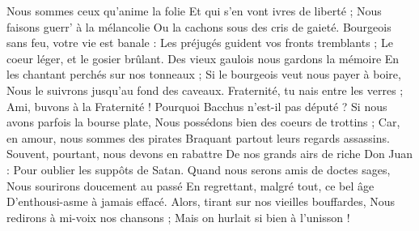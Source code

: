  \footnotemark
[ititle={Marche des Etudiants, La}, ititle={Chant des étudiants}, tu={Les Gueux (P. : Paul Vanderborght, 1919)}]

\beginverse
Nous sommes ceux qu'anime la folie
Et qui s'en vont ivres de liberté ;
Nous faisons guerr' à la mélancolie
Ou la cachons sous des cris de gaieté.
Bourgeois sans feu, votre vie est banale :
Les préjugés guident vos fronts tremblants ;
Le coeur léger, et le gosier brûlant. 
\endverse
\beginverse
Des vieux gaulois nous gardons la mémoire
En les chantant perchés sur nos tonneaux ;
Si le bourgeois veut nous payer à boire,
Nous le suivrons jusqu'au fond des caveaux.
Fraternité, tu nais entre les verres ;
Ami, buvons à la Fraternité !
Pourquoi Bacchus n'est-il pas député ? 
\endverse
\beginverse
Si nous avons parfois la bourse plate,
Nous possédons bien des coeurs de trottins ;
Car, en amour, nous sommes des pirates
Braquant partout leurs regards assassins.
Souvent, pourtant, nous devons en rabattre
De nos grands airs de riche Don Juan :
Pour oublier les suppôts de Satan. 
\endverse
\beginverse
Quand nous serons amis de doctes sages,
Nous sourirons doucement au passé
En regrettant, malgré tout, ce bel âge
D'enthousi-asme à jamais effacé.
Alors, tirant sur nos vieilles bouffardes,
Nous redirons à mi-voix nos chansons ;
Mais on hurlait si bien à l'unisson ! 
\endverse
\endsong